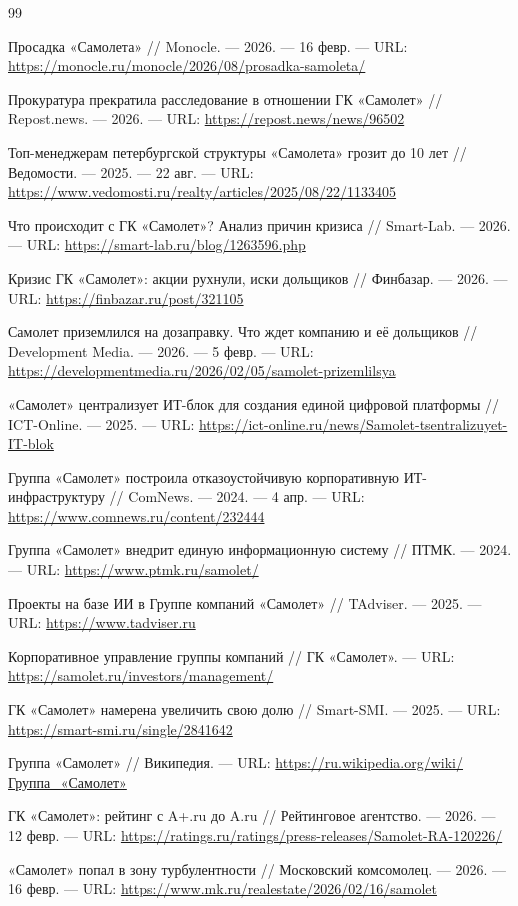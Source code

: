 \documentclass[12pt,a4paper]{article}
\begin{document}
\renewcommand{\refname}{Список источников}
\begin{thebibliography}{99}

 Просадка «Самолета» // Monocle. --- 2026. --- 16 февр. --- URL: \url{https://monocle.ru/monocle/2026/08/prosadka-samoleta/}

 Прокуратура прекратила расследование в отношении ГК «Самолет» // Repost.news. --- 2026. --- URL: \url{https://repost.news/news/96502}

 Топ-менеджерам петербургской структуры «Самолета» грозит до 10 лет // Ведомости. --- 2025. --- 22 авг. --- URL: \url{https://www.vedomosti.ru/realty/articles/2025/08/22/1133405}

 Что происходит с ГК «Самолет»? Анализ причин кризиса // Smart-Lab. --- 2026. --- URL: \url{https://smart-lab.ru/blog/1263596.php}

 Кризис ГК «Самолет»: акции рухнули, иски дольщиков // Финбазар. --- 2026. --- URL: \url{https://finbazar.ru/post/321105}

 Самолет приземлился на дозаправку. Что ждет компанию и её дольщиков // Development Media. --- 2026. --- 5 февр. --- URL: \url{https://developmentmedia.ru/2026/02/05/samolet-prizemlilsya}

 «Самолет» централизует ИТ-блок для создания единой цифровой платформы // ICT-Online. --- 2025. --- URL: \url{https://ict-online.ru/news/Samolet-tsentralizuyet-IT-blok}

 Группа «Самолет» построила отказоустойчивую корпоративную ИТ-инфраструктуру // ComNews. --- 2024. --- 4 апр. --- URL: \url{https://www.comnews.ru/content/232444}

 Группа «Самолет» внедрит единую информационную систему // ПТМК. --- 2024. --- URL: \url{https://www.ptmk.ru/samolet/}

 Проекты на базе ИИ в Группе компаний «Самолет» // TAdviser. --- 2025. --- URL: \url{https://www.tadviser.ru}

 Корпоративное управление группы компаний // ГК «Самолет». --- URL: \url{https://samolet.ru/investors/management/}

 ГК «Самолет» намерена увеличить свою долю // Smart-SMI. --- 2025. --- URL: \url{https://smart-smi.ru/single/2841642}

 Группа «Самолет» // Википедия. --- URL: \url{https://ru.wikipedia.org/wiki/Группа_«Самолет»}

 ГК «Самолет»: рейтинг с A+.ru до A.ru // Рейтинговое агентство. --- 2026. --- 12 февр. --- URL: \url{https://ratings.ru/ratings/press-releases/Samolet-RA-120226/}

 «Самолет» попал в зону турбулентности // Московский комсомолец. --- 2026. --- 16 февр. --- URL: \url{https://www.mk.ru/realestate/2026/02/16/samolet}

\end{thebibliography}
\end{document}
